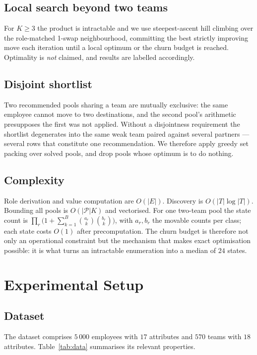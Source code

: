 \documentclass[conference]{IEEEtran}
\begin{document}
\subsection{Local search beyond two teams}
For $K\ge3$ the product is intractable and we use steepest-ascent hill climbing
over the role-matched 1-swap neighbourhood, committing the best strictly
improving move each iteration until a local optimum or the churn budget is
reached. Optimality is \emph{not} claimed, and results are labelled accordingly.

\subsection{Disjoint shortlist}
Two recommended pools sharing a team are mutually exclusive: the same employee
cannot move to two destinations, and the second pool's arithmetic presupposes
the first was not applied. Without a disjointness requirement the shortlist
degenerates into the same weak team paired against several partners --- several
rows that constitute one recommendation. We therefore apply greedy set packing
over solved pools, and drop pools whose optimum is to do nothing.

\subsection{Complexity}
Role derivation and value computation are $O(|E|)$. Discovery is
$O(|T|\log|T|)$. Bounding all pools is $O(|\mathcal{P}|K)$ and vectorised.
For one two-team pool the state count is
$\prod_{r}\big(1+\sum_{k=1}^{B}\binom{a_r}{k}\binom{b_r}{k}\big)$,
with $a_r,b_r$ the movable counts per class; each state costs $O(1)$ after
precomputation. The churn budget is therefore not only an operational constraint
but the mechanism that makes exact optimisation possible: it is what turns an
intractable enumeration into a median of $24$ states.

\section{Experimental Setup}\label{sec:setup}

\subsection{Dataset}
The dataset comprises $5\,000$ employees with $17$ attributes and $570$ teams
with $18$ attributes. Table~\ref{tab:data} summarises its relevant properties.
\end{document}

